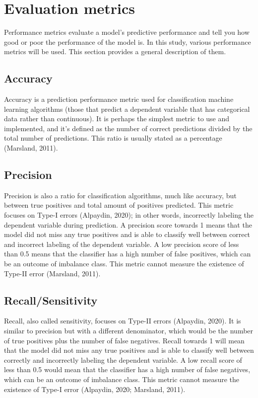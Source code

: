 \documentclass[
  man]{apa7}
\begin{document}
\section{Evaluation metrics}\label{evaluation-metrics}

Performance metrics evaluate a model's predictive performance and tell you how good or poor the performance of the model is.
In this study, various performance metrics will be used.
This section provides a general description of them.

\subsection{Accuracy}\label{accuracy}

Accuracy is a prediction performance metric used for classification machine learning algorithms (those that predict a dependent variable that has categorical data rather than continuous).
It is perhaps the simplest metric to use and implemented, and it's defined as the number of correct predictions divided by the total number of predictions.
This ratio is usually stated as a percentage (Marsland, 2011).

\subsection{Precision}\label{precision}

Precision is also a ratio for classification algorithms, much like accuracy, but between true positives and total amount of positives predicted.
This metric focuses on Type-I errors (Alpaydin, 2020); in other words, incorrectly labeling the dependent variable during prediction.
A precision score towards 1 means that the model did not miss any true positives and is able to classify well between correct and incorrect labeling of the dependent variable.
A low precision score of less than 0.5 means that the classifier has a high number of false positives, which can be an outcome of imbalance class.
This metric cannot measure the existence of Type-II error (Marsland, 2011).

\subsection{Recall/Sensitivity}\label{recallsensitivity}

Recall, also called sensitivity, focuses on Type-II errors (Alpaydin, 2020).
It is similar to precision but with a different denominator, which would be the number of true positives plus the number of false negatives.
Recall towards 1 will mean that the model did not miss any true positives and is able to classify well between correctly and incorrectly labeling the dependent variable.
A low recall score of less than 0.5 would mean that the classifier has a high number of false negatives, which can be an outcome of imbalance class.
This metric cannot measure the existence of Type-I error (Alpaydin, 2020; Marsland, 2011).
\end{document}
